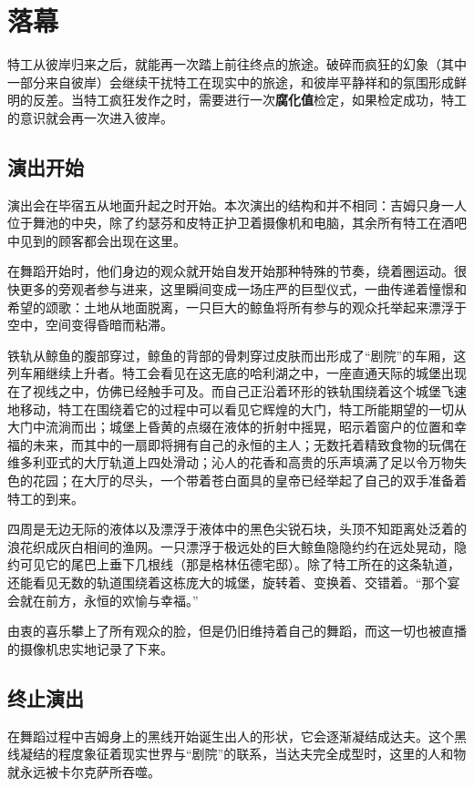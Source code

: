 \section{落幕}

特工从彼岸归来之后，就能再一次踏上前往终点的旅途。破碎而疯狂的幻象（其中一部分来自彼岸）会继续干扰特工在现实中的旅途，和彼岸平静祥和的氛围形成鲜明的反差。当特工疯狂发作之时，需要进行一次\textbf{腐化值}检定，如果检定成功，特工的意识就会再一次进入彼岸。

\subsection{演出开始}

演出会在毕宿五从地面升起之时开始。本次演出的结构和并不相同：吉姆只身一人位于舞池的中央，除了约瑟芬和皮特正护卫着摄像机和电脑，其余所有特工在酒吧中见到的顾客都会出现在这里。

在舞蹈开始时，他们身边的观众就开始自发开始那种特殊的节奏，绕着圈运动。很快更多的旁观者参与进来，这里瞬间变成一场庄严的巨型仪式，一曲传递着憧憬和希望的颂歌：土地从地面脱离，一只巨大的鲸鱼将所有参与的观众托举起来漂浮于空中，空间变得昏暗而粘滞。

铁轨从鲸鱼的腹部穿过，鲸鱼的背部的骨刺穿过皮肤而出形成了“剧院”的车厢，这列车厢继续上升者。特工会看见在这无底的哈利湖之中，一座直通天际的城堡出现在了视线之中，仿佛已经触手可及。而自己正沿着环形的铁轨围绕着这个城堡飞速地移动，特工在围绕着它的过程中可以看见它辉煌的大门，特工所能期望的一切从大门中流淌而出；城堡上昏黄的点缀在液体的折射中摇晃，昭示着窗户的位置和幸福的未来，而其中的一扇即将拥有自己的永恒的主人；无数托着精致食物的玩偶在维多利亚式的大厅轨道上四处滑动；沁人的花香和高贵的乐声填满了足以令万物失色的花园；在大厅的尽头，一个带着苍白面具的皇帝已经举起了自己的双手准备着特工的到来。

四周是无边无际的液体以及漂浮于液体中的黑色尖锐石块，头顶不知距离处泛着的浪花织成灰白相间的渔网。一只漂浮于极远处的巨大鲸鱼隐隐约约在远处晃动，隐约可见它的尾巴上垂下几根线（那是格林伍德宅邸）。除了特工所在的这条轨道，还能看见无数的轨道围绕着这栋庞大的城堡，旋转着、变换着、交错着。“那个宴会就在前方，永恒的欢愉与幸福。”

由衷的喜乐攀上了所有观众的脸，但是仍旧维持着自己的舞蹈，而这一切也被直播的摄像机忠实地记录了下来。

\subsection{终止演出}

在舞蹈过程中吉姆身上的黑线开始诞生出人的形状，它会逐渐凝结成达夫。这个黑线凝结的程度象征着现实世界与“剧院”的联系，当达夫完全成型时，这里的人和物就永远被卡尔克萨所吞噬。

